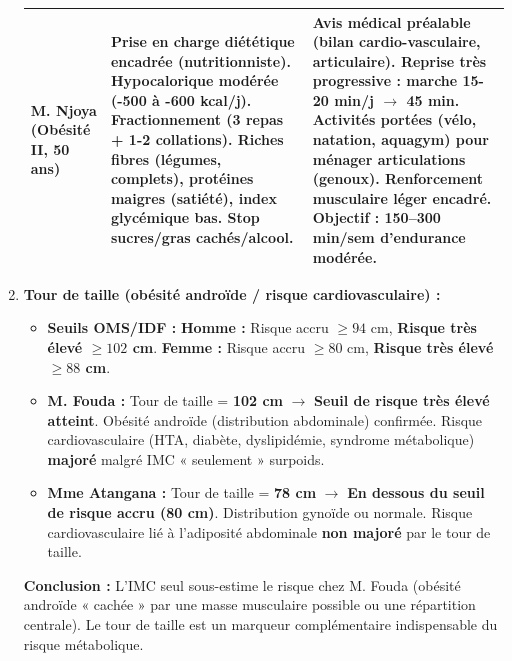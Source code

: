 \documentclass[11pt]{article}
\begin{document}
\begin{corrige}
\begin{enumerate}
\begin{center}
\begin{tabularx}{\linewidth}{|l|X|X|}
    \textbf{M. Njoya} (Obésité II, 50 ans) & \textbf{Prise en charge diététique encadrée} (nutritionniste). Hypocalorique modérée (-500 à -600 kcal/j). Fractionnement (3 repas + 1-2 collations). Riches fibres (légumes, complets), protéines maigres (satiété), index glycémique bas. Stop sucres/gras cachés/alcool. & \textbf{Avis médical préalable} (bilan cardio-vasculaire, articulaire). Reprise \textbf{très progressive} : marche 15-20 min/j $\rightarrow$ 45 min. Activités portées (vélo, natation, aquagym) pour ménager articulations (genoux). Renforcement musculaire léger encadré. Objectif : 150–300 min/sem d'endurance modérée. \\ \hline
    \end{tabularx}
    \end{center}
    \item \textbf{Tour de taille (obésité androïde / risque cardiovasculaire) :}
    \begin{itemize}
        \item \textbf{Seuils OMS/IDF :} \textbf{Homme :} Risque accru $\ge 94$ cm, \textbf{Risque très élevé $\ge 102$ cm}. \textbf{Femme :} Risque accru $\ge 80$ cm, \textbf{Risque très élevé $\ge 88$ cm}.
        \item \textbf{M. Fouda :} Tour de taille = \textbf{102 cm} $\rightarrow$ \textbf{Seuil de risque très élevé atteint}. Obésité androïde (distribution abdominale) confirmée. Risque cardiovasculaire (HTA, diabète, dyslipidémie, syndrome métabolique) \textbf{majoré} malgré IMC « seulement » surpoids.
        \item \textbf{Mme Atangana :} Tour de taille = \textbf{78 cm} $\rightarrow$ \textbf{En dessous du seuil de risque accru (80 cm)}. Distribution gynoïde ou normale. Risque cardiovasculaire lié à l'adiposité abdominale \textbf{non majoré} par le tour de taille.
    \end{itemize}
    \textbf{Conclusion :} L'IMC seul sous-estime le risque chez M. Fouda (obésité androïde « cachée » par une masse musculaire possible ou une répartition centrale). Le tour de taille est un marqueur complémentaire indispensable du risque métabolique.
\end{enumerate}
\end{corrige}
\end{document}
